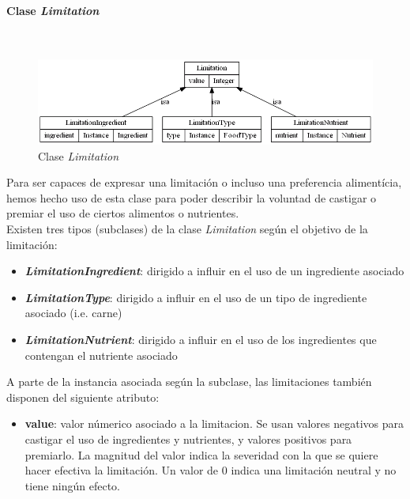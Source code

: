 \documentclass[12]{article}
\begin{document}
\paragraph{Clase \emph{Limitation}}\mbox{}\\
\begin{figure}[H]
\centering
\includegraphics[scale=0.5]{images/class_Limitation.png}
\caption{Clase \emph{Limitation}}
\label{fig_class_Limitation}
\end{figure}

Para ser capaces de expresar una limitación o incluso una preferencia alimentícia, hemos hecho uso de esta clase para poder describir la voluntad de castigar o premiar el uso de ciertos alimentos o nutrientes.
\\

Existen tres tipos (subclases) de la clase \emph{Limitation} según el objetivo de la limitación:
\begin{itemize}
\item \emph{\textbf{LimitationIngredient}}: dirigido a influir en el uso de un ingrediente asociado
\item \emph{\textbf{LimitationType}}: dirigido a influir en el uso de un tipo de ingrediente asociado (i.e. carne)
\item \emph{\textbf{LimitationNutrient}}: dirigido a influir en el uso de los ingredientes que contengan el nutriente asociado

\end{itemize}

A parte de la instancia asociada según la subclase, las limitaciones también disponen del siguiente atributo:
\begin{itemize}
\item \textbf{value}: valor númerico asociado a la limitacion. Se usan valores negativos para castigar el uso de ingredientes y nutrientes, y valores positivos para premiarlo. La magnitud del valor indica la severidad con la que se quiere hacer efectiva la limitación. Un valor de 0 indica una limitación neutral y no tiene ningún efecto. 
\end{itemize}
\end{document}
